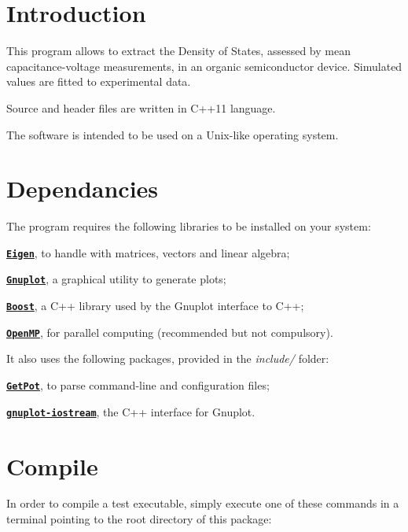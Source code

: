 \hypertarget{index_intro}{}\section{Introduction}\label{index_intro}
This program allows to extract the Density of States, assessed by mean capacitance-\/voltage measurements, in an organic semiconductor device. Simulated values are fitted to experimental data. \par
Source and header files are written in C++11 language. \par
The software is intended to be used on a Unix-\/like operating system.\hypertarget{index_dependancies}{}\section{Dependancies}\label{index_dependancies}
The program requires the following libraries to be installed on your system\-:

\begin{DoxyItemize}
\item \href{http://eigen.tuxfamily.org}{\tt {\bfseries Eigen}}, to handle with matrices, vectors and linear algebra; \item \href{http://www.gnuplot.info}{\tt {\bfseries Gnuplot}}, a graphical utility to generate plots; \item \href{http://www.boost.org}{\tt {\bfseries Boost}}, a C++ library used by the Gnuplot interface to C++; \item \href{http://openmp.org}{\tt {\bfseries Open\-M\-P}}, for parallel computing (recommended but not compulsory).\end{DoxyItemize}
It also uses the following packages, provided in the {\itshape include/} folder\-: \begin{DoxyItemize}
\item \href{http://getpot.sourceforge.net}{\tt {\bfseries Get\-Pot}}, to parse command-\/line and configuration files; \item \href{http://www.stahlke.org/dan/gnuplot-iostream}{\tt {\bfseries gnuplot-\/iostream}}, the C++ interface for Gnuplot.\end{DoxyItemize}
\hypertarget{index_install_sec}{}\section{Compile}\label{index_install_sec}
In order to compile a test executable, simply execute one of these commands in a terminal pointing to the root directory of this package\-:


